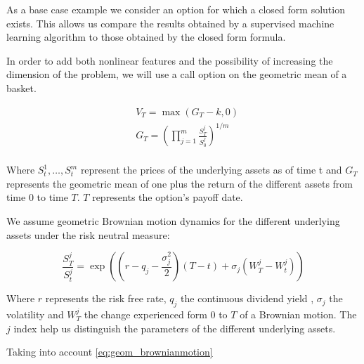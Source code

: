 As a base case example we consider an option for which a closed form solution exists. This allows us compare the results obtained by a supervised machine learning algorithm to those obtained by the closed form formula.

In order to add both nonlinear features and the possibility of increasing the dimension of the problem, we will use a call option on the geometric mean of a basket.

\begin{equation}\label{eq:geom_digital}
\begin{aligned}
&V_{T}=\max\left(G_T-k,0\right) \\
&G_{T}=\left(\prod_{j=1}^{m} \frac{S_{T}^{j}}{S_{0}^{j}}\right)^{1 / m} \\
\end{aligned}
\end{equation}

Where $S_t^1,\ldots,S_t^m$ represent the prices of the underlying assets as of time t and $G_T$ represents the geometric mean of one plus the return of the different assets from time $0$ to time $T$. $T$ represents the option's payoff date.

We assume geometric Brownian motion dynamics  for the different underlying assets under the risk neutral measure:

\begin{equation}\label{eq:geom_brownianmotion}
\frac{S_{T}^{j}}{S_{t}^{j}}=\exp\left(\left(r-q_{j}-\frac{\sigma_{j}^{2}}{2}\right) \left( T - t\right)+\sigma_{j} \left(W_{T}^{j}-W_{t}^{j}\right)\right)
\end{equation}

Where $r$ represents the risk free rate, $q_j$ the continuous dividend yield , $\sigma_j$ the volatility and $W_T^j$ the change experienced form $0$ to $T$ of a Brownian motion. The $j$ index help us distinguish the parameters of the different underlying assets.

Taking into account \ref{eq:geom_brownianmotion}

